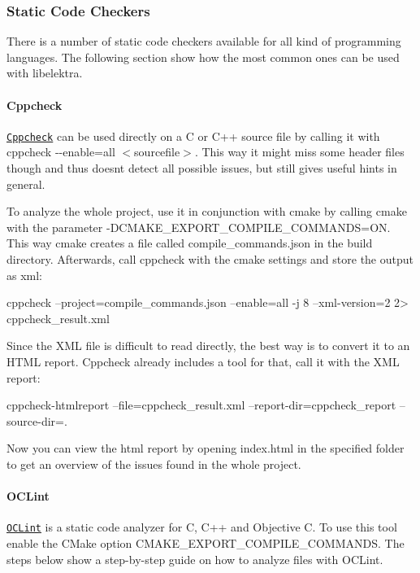 \subsubsection*{Static Code Checkers}

There is a number of static code checkers available for all kind of programming languages. The following section show how the most common ones can be used with {\ttfamily libelektra}.

\paragraph*{Cppcheck}

\href{http://cppcheck.sourceforge.net/}{\tt Cppcheck} can be used directly on a C or C++ source file by calling it with {\ttfamily cppcheck -\/-\/enable=all $<$sourcefile$>$}. This way it might miss some header files though and thus doesn\textquotesingle{}t detect all possible issues, but still gives useful hints in general.

To analyze the whole project, use it in conjunction with {\ttfamily cmake} by calling {\ttfamily cmake} with the parameter {\ttfamily -\/\+D\+C\+M\+A\+K\+E\+\_\+\+E\+X\+P\+O\+R\+T\+\_\+\+C\+O\+M\+P\+I\+L\+E\+\_\+\+C\+O\+M\+M\+A\+N\+DS=ON}. This way {\ttfamily cmake} creates a file called {\ttfamily compile\+\_\+commands.\+json} in the build directory. Afterwards, call {\ttfamily cppcheck} with the cmake settings and store the output as xml\+: \begin{DoxyVerb}cppcheck --project=compile_commands.json --enable=all -j 8 --xml-version=2 2> cppcheck_result.xml
\end{DoxyVerb}


Since the X\+ML file is difficult to read directly, the best way is to convert it to an H\+T\+ML report. Cppcheck already includes a tool for that, call it with the X\+ML report\+: \begin{DoxyVerb}cppcheck-htmlreport --file=cppcheck_result.xml --report-dir=cppcheck_report --source-dir=.
\end{DoxyVerb}


Now you can view the html report by opening {\ttfamily index.\+html} in the specified folder to get an overview of the issues found in the whole project.

\paragraph*{O\+C\+Lint}

\href{http://oclint.org/}{\tt O\+C\+Lint} is a static code analyzer for C, C++ and Objective C. To use this tool enable the C\+Make option {\ttfamily C\+M\+A\+K\+E\+\_\+\+E\+X\+P\+O\+R\+T\+\_\+\+C\+O\+M\+P\+I\+L\+E\+\_\+\+C\+O\+M\+M\+A\+N\+DS}. The steps below show a step-\/by-\/step guide on how to analyze files with O\+C\+Lint.


